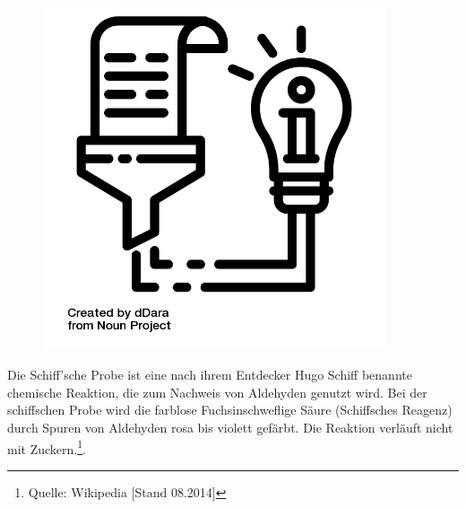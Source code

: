 \documentclass{scrartcl}  %
\begin{document}
\vspace{0.3cm}
			\begin{tcolorbox}[enhanced,
				colback=white,
				colframe=darkgray,
				fonttitle=\sffamily\bfseries\large, 
				title=Die Schiff'sche Probe,  %
				attach boxed title to top left={xshift=3.2mm,yshift=-0.50mm},
				boxed title style={skin=enhancedfirst jigsaw,size=small,arc=1mm,bottom=-1mm,colframe=darkgray,height=0.75cm},
				colbacktitle=darkgray,
				drop lifted shadow]
				\begin{figure}  
					\centering
					\vspace{-14pt}  %
					\includegraphics[width=0.9\textwidth]{symbols/symbol_tex_content}
				\end{figure}
				
				Die Schiff'sche Probe ist eine nach ihrem Entdecker Hugo Schiff benannte chemische Reaktion, die zum Nachweis von Aldehyden genutzt wird. Bei der schiffschen Probe wird die farblose Fuchsinschweflige Säure (Schiffsches Reagenz) durch Spuren von Aldehyden rosa bis violett gefärbt. \newline
				Die Reaktion verläuft nicht mit Zuckern.\footnote{Quelle: Wikipedia [Stand 08.2014]}. 
				\vspace{0.1cm}		
			\end{tcolorbox}	


\newpage
\end{document}
